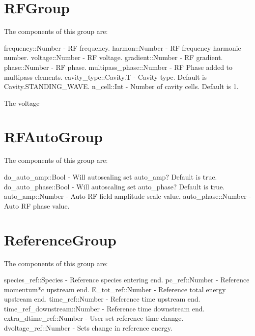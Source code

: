 \section{RFGroup}
\label{s:rf.g}

The components of this group are:
\begin{example}
  frequency::Number         - RF frequency. 
  harmon::Number            - RF frequency harmonic number. 
  voltage::Number           - RF voltage. 
  gradient::Number          - RF gradient. 
  phase::Number             - RF phase. 
  multipass_phase::Number   - RF Phase added to multipass elements. 
  cavity_type::Cavity.T     - Cavity type. Default is Cavity.STANDING_WAVE. 
  n_cell::Int               - Number of cavity cells. Default is 1. 
\end{example}


The voltage

\section{RFAutoGroup}
\label{s:rfauto.g}

The components of this group are:
\begin{example}
  do_auto_amp::Bool           - Will autoscaling set auto_amp? Default is true. 
  do_auto_phase::Bool         - Will autoscaling set auto_phase? Default is true. 
  auto_amp::Number            - Auto RF field amplitude scale value. 
  auto_phase::Number          - Auto RF phase value. 
\end{example}

\section{ReferenceGroup}
\label{s:reference.g}

The components of this group are:
\begin{example}
  species_ref::Species          - Reference species entering end. 
  pc_ref::Number                - Reference momentum*c upstream end. 
  E_tot_ref::Number             - Reference total energy upstream end. 
  time_ref::Number              - Reference time upstream end. 
  time_ref_downstream::Number   - Reference time downstream end. 
  extra_dtime_ref::Number       - User set reference time change.
  dvoltage_ref::Number          - Sets change in reference energy.
\end{example}

